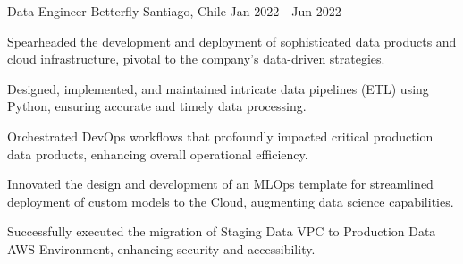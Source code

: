   \cventry
  {Data Engineer}
  {Betterfly}
  {Santiago, Chile}
  {Jan 2022 - Jun 2022}
  {
  \begin{cvitems} %
    \item Spearheaded the development and deployment of sophisticated data products and cloud infrastructure, pivotal to the company's data-driven strategies.
    \item Designed, implemented, and maintained intricate data pipelines (ETL) using Python, ensuring accurate and timely data processing.
    \item Orchestrated DevOps workflows that profoundly impacted critical production data products, enhancing overall operational efficiency.
    \item Innovated the design and development of an MLOps template for streamlined deployment of custom models to the Cloud, augmenting data science capabilities.
    \item Successfully executed the migration of Staging Data VPC to Production Data AWS Environment, enhancing security and accessibility.
  \end{cvitems}
  }
